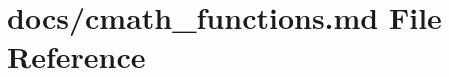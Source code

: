 \hypertarget{cmath__functions_8md}{}\section{docs/cmath\+\_\+functions.md File Reference}
\label{cmath__functions_8md}
